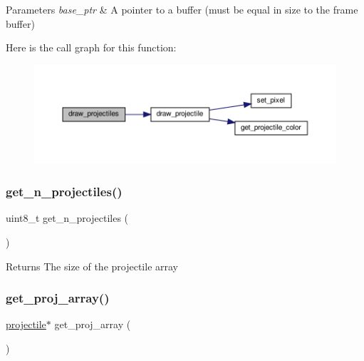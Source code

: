 \begin{DoxyParams}{Parameters}
{\em base\+\_\+ptr} & A pointer to a buffer (must be equal in size to the frame buffer) \\
\hline
\end{DoxyParams}
Here is the call graph for this function\+:\nopagebreak
\begin{figure}[H]
\begin{center}
\leavevmode
\includegraphics[width=350pt]{group__projectiles_gae77390eb18c5b9c31165e891a1ab4b19_cgraph}
\end{center}
\end{figure}
\mbox{\label{group__projectiles_ga5694db4d07322ea0cb9792dd0409dcd6}} 
\subsubsection{\texorpdfstring{get\+\_\+n\+\_\+projectiles()}{get\_n\_projectiles()}}
{\footnotesize\ttfamily uint8\+\_\+t get\+\_\+n\+\_\+projectiles (\begin{DoxyParamCaption}{ }\end{DoxyParamCaption})}

\begin{DoxyReturn}{Returns}
The size of the projectile array 
\end{DoxyReturn}
\mbox{\label{group__projectiles_ga83c71feca8610bd78396e078b96c7607}} 
\subsubsection{\texorpdfstring{get\+\_\+proj\+\_\+array()}{get\_proj\_array()}}
{\footnotesize\ttfamily \hyperlink{structprojectile}{projectile}$\ast$ get\+\_\+proj\+\_\+array (\begin{DoxyParamCaption}{ }\end{DoxyParamCaption})}

